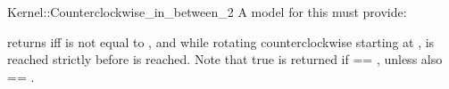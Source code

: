 
\begin{ccRefFunctionObjectConcept}{Kernel::Counterclockwise_in_between_2}
A model for this must provide:


{returns  iff  is not equal to , and 
        while rotating counterclockwise starting at , 
         is reached strictly before  is reached.
        Note that true is returned if  == , unless
        also  == .}

\ccIsModel{}

\end{ccRefFunctionObjectConcept}
